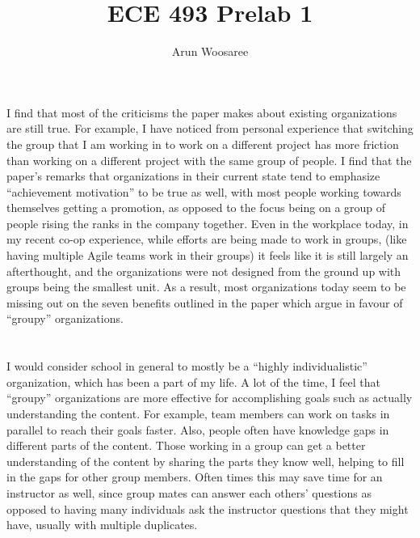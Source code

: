 \documentclass[letterpaper,12pt]{article}
\title{ECE 493 Prelab 1}
\author{Arun Woosaree\\
}
\begin{document}
\maketitle
  \section{}
  I find that most of the criticisms the paper makes about existing
  organizations are still true. For example, I have noticed from personal
  experience that switching the group that I am working in to work on a
  different project has more friction than working on a different project with
  the same group of people. I find that the paper's remarks that organizations
  in their current state tend to emphasize ``achievement motivation'' to be true
  as well, with most people working towards themselves getting a promotion, as
  opposed to the focus being on a group of people rising the ranks in the
  company together.  Even in the workplace today, in my recent co-op
  experience, while efforts are being made to work in groups, (like having
  multiple Agile teams work in their groups) it feels like it is still largely
  an afterthought, and the organizations were not designed from the ground up
  with groups being the smallest unit. As a result, most organizations today
  seem to be missing out on the seven benefits outlined in the paper which
  argue in favour of ``groupy'' organizations.


  \section{}
  I would consider school in general to mostly be a ``highly individualistic''
  organization, which has been a part of my life.  A lot of the time, I feel
  that ``groupy'' organizations are more effective for accomplishing goals such
  as actually understanding the content.  For example, team members can work on
  tasks in parallel to reach their goals faster. Also, people often have
  knowledge gaps in different parts of the content. Those working in a group
  can get a better understanding of the content by sharing the parts they know
  well, helping to fill in the gaps for other group members. Often times this
  may save time for an instructor as well, since group mates can answer each
  others' questions as opposed to having many individuals ask the instructor
  questions that they might have, usually with multiple duplicates.
\end{document}
